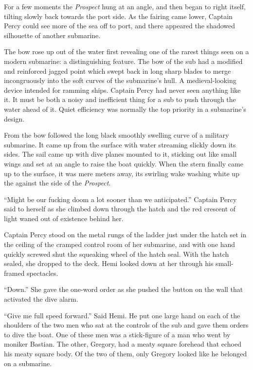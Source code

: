 \documentclass[
]{scrbook}
\begin{document}
For a few moments the \emph{Prospect} hung at an angle, and then began
to right itself, tilting slowly back towards the port side. As the
fairing came lower, Captain Percy could see more of the sea off to port,
and there appeared the shadowed silhouette of another submarine.

The bow rose up out of the water first revealing one of the rarest
things seen on a modern submarine: a distinguishing feature. The bow of
the sub had a modified and reinforced jagged point which swept back in
long sharp blades to merge incongruously into the soft curves of the
submarine's hull. A medieval-looking device intended for ramming ships.
Captain Percy had never seen anything like it. It must be both a noisy
and inefficient thing for a sub to push through the water ahead of it.
Quiet efficiency was normally the top priority in a submarine's design.

From the bow followed the long black smoothly swelling curve of a
military submarine. It came up from the surface with water streaming
slickly down its sides. The sail came up with dive planes mounted to it,
sticking out like small wings and set at an angle to raise the boat
quickly. When the stern finally came up to the surface, it was mere
meters away, its swirling wake washing white up the against the side of
the \emph{Prospect}.

``Might be our fucking doom a lot sooner than we anticipated.'' Captain
Percy said to herself as she climbed down through the hatch and the red
crescent of light waned out of existence behind her.

Captain Percy stood on the metal rungs of the ladder just under the
hatch set in the ceiling of the cramped control room of her submarine,
and with one hand quickly screwed shut the squeaking wheel of the hatch
seal. With the hatch sealed, she dropped to the deck. Hemi looked down
at her through his small-framed spectacles.

``Down.'' She gave the one-word order as she pushed the button on the
wall that activated the dive alarm.

``Give me full speed forward.'' Said Hemi. He put one large hand on each
of the shoulders of the two men who sat at the controls of the sub and
gave them orders to dive the boat. One of these men was a stick-figure
of a man who went by moniker Bastian. The other, Gregory, had a meaty
square forehead that echoed his meaty square body. Of the two of them,
only Gregory looked like he belonged on a submarine.
\end{document}
